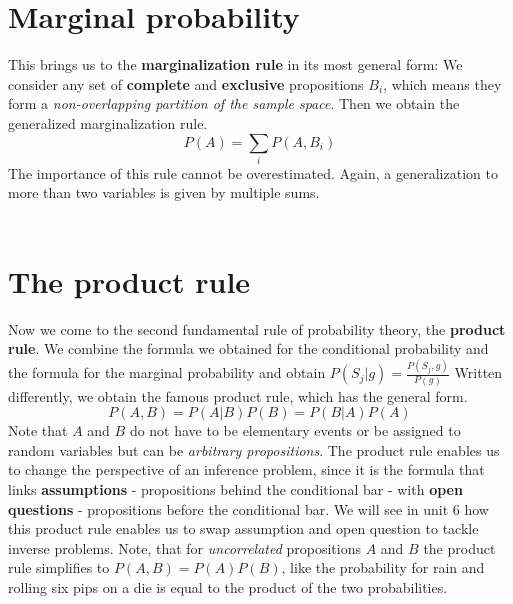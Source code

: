 \documentclass[12pt, a4paper]{scrartcl}
\begin{document}
\section*{Marginal probability}
This brings us to the \textbf{marginalization rule} in its most general form: 
We consider any set of  \textbf{complete} and  \textbf{exclusive} propositions $B_i$, which means they form a \textit{non-overlapping partition of the sample space}.
Then we obtain the generalized marginalization rule.
\begin{equation*}\boxed{P(A)=\sum_iP(A,B_i)}\end{equation*}
The importance of this rule cannot be overestimated.
Again, a generalization to more than two variables is given by multiple sums.\\
\\

\section*{The product rule}
Now we come to the second fundamental rule of probability theory, the  \textbf{product rule}.
We combine the formula we obtained for the conditional probability and the formula for the marginal probability and obtain $P(S_j|g) = \frac{P(S_j, g)}{P(g)}$ 
Written differently, we obtain the famous product rule, which has the general form. 
\begin{equation*}\boxed{P(A,B)=P(A|B)P(B) = P(B|A)P(A)}\end{equation*}
Note that $A$ and $B$ do not have to be elementary events or be assigned to random variables but can be \textit{arbitrary propositions}.
The product rule enables us to change the perspective of an inference problem, since it is the formula that links  \textbf{assumptions} - propositions behind the conditional bar - with  \textbf{open questions} - propositions before the conditional bar. We will see in unit 6 how this product rule enables us to swap assumption and open question to tackle inverse problems.
Note, that for \textit{uncorrelated} propositions $A$ and $B$ the product rule simplifies to $P(A,B)=P(A)P(B)$, like the probability for rain and rolling six pips on a die is equal to the product of the two probabilities.\\
\end{document}
